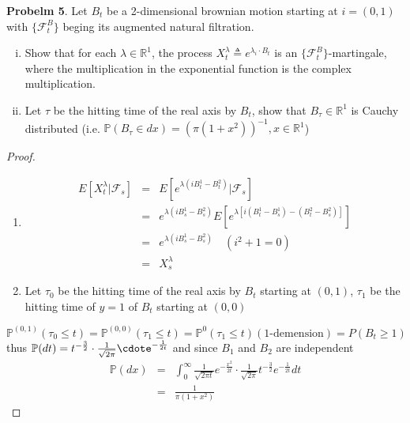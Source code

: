 \documentclass{article}     %
\begin{document}
\noindent
\textbf{Probelm 5}.  Let $B_t$ be a 2-dimensional brownian motion starting at $i=(0,1)$ with $\{\mathcal{F}_t^B\}$ beging its augmented natural filtration.
\begin{enumerate}[(i)]
    \item Show that for each $\lambda \in \mathbb{R}^1$, the process $X_t^{\lambda}\triangleq e^{\lambda_{i}\cdot B_t}$ is an $\{\mathcal{F}_t^B\}$-martingale, where the multiplication in the exponential function is the complex multiplication.
    \item Let $\tau$ be the hitting time of the real axis by $B_t$, show that $B_{\tau}\in \mathbb{R}^1$ is Cauchy distributed (i.e. $\mathbb{P}(B_{\tau}\in dx)=(\pi(1+x^2))^{-1}, x\in \mathbb{R}^1$)
\end{enumerate}

\begin{proof}
\begin{enumerate}[(1)]
    \item 
    \begin{eqnarray*}
        E[X_t^{\lambda}|\mathcal{F}_s] & = & E[e^{\lambda(iB^1_t-B^2_t)}|\mathcal{F}_s]\\
         & = & e^{\lambda(iB^1_s-B^2_s)}E[e^{\lambda[i(B^1_t-B^1_s)-(B^2_t-B^2_s)]}]\\
         & = & e^{\lambda(iB^1_s-B^2_s)}\quad (i^2+1=0)\\
         & = & X_s^{\lambda}
         \end{eqnarray*}
     \item Let $\tau_0$ be the hitting time of the real axis by $B_t$ starting at $(0,1)$, $\tau_1$ be the hitting time of $y=1$ of $B_t$ starting at $(0,0)$
\end{enumerate}
\[\mathbb{P}^{(0,1)}(\tau_0\leq t)=\mathbb{P}^{(0,0)}(\tau_1\leq t)=\mathbb{P}^0(\tau_1\leq t)(\text{1-demension})=P(B_t\geq 1)\]
thus $\mathbb{P}(dt)=t^{-\frac{3}{2}}\cdot \frac{1}{\sqrt{2\pi}}\cdote^{-\frac{1}{2t}}$ and since $B_1$ and $B_2$ are independent
\begin{eqnarray*}
\mathbb{P}(dx)& = & \int_0^{\infty}\frac{1}{\sqrt{2\pi t}}e^{-\frac{x^2}{2t}}\cdot \frac{1}{\sqrt{2\pi}}t^{-\frac{3}{2}}e^{-\frac{1}{2t}}dt\\
     & = & \frac{1}{\pi(1+x^2)}
\end{eqnarray*}
\end{proof}
\end{document}

